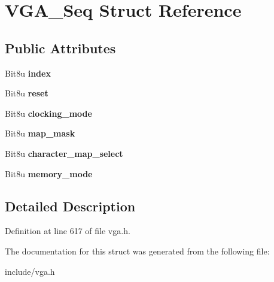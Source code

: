\hypertarget{structVGA__Seq}{\section{V\-G\-A\-\_\-\-Seq Struct Reference}
\label{structVGA__Seq}
}
\subsection*{Public Attributes}
\begin{DoxyCompactItemize}
\item 
\hypertarget{structVGA__Seq_a00643c92e5873dcf83d17a3135b2d693}{Bit8u {\bfseries index}}\label{structVGA__Seq_a00643c92e5873dcf83d17a3135b2d693}

\item 
\hypertarget{structVGA__Seq_a3425fe4beaea31df04abd4a6b4dc34ce}{Bit8u {\bfseries reset}}\label{structVGA__Seq_a3425fe4beaea31df04abd4a6b4dc34ce}

\item 
\hypertarget{structVGA__Seq_a86024bda4c152b6e0bee83581155233e}{Bit8u {\bfseries clocking\-\_\-mode}}\label{structVGA__Seq_a86024bda4c152b6e0bee83581155233e}

\item 
\hypertarget{structVGA__Seq_a318a641c4a0ca18dd7de0de41e475bdc}{Bit8u {\bfseries map\-\_\-mask}}\label{structVGA__Seq_a318a641c4a0ca18dd7de0de41e475bdc}

\item 
\hypertarget{structVGA__Seq_a259ad5c028390b8e3f2247913c493044}{Bit8u {\bfseries character\-\_\-map\-\_\-select}}\label{structVGA__Seq_a259ad5c028390b8e3f2247913c493044}

\item 
\hypertarget{structVGA__Seq_a73f957b3431c728ff5908dfb58ed1e75}{Bit8u {\bfseries memory\-\_\-mode}}\label{structVGA__Seq_a73f957b3431c728ff5908dfb58ed1e75}

\end{DoxyCompactItemize}


\subsection{Detailed Description}


Definition at line 617 of file vga.\-h.



The documentation for this struct was generated from the following file\-:\begin{DoxyCompactItemize}
\item 
include/vga.\-h\end{DoxyCompactItemize}
